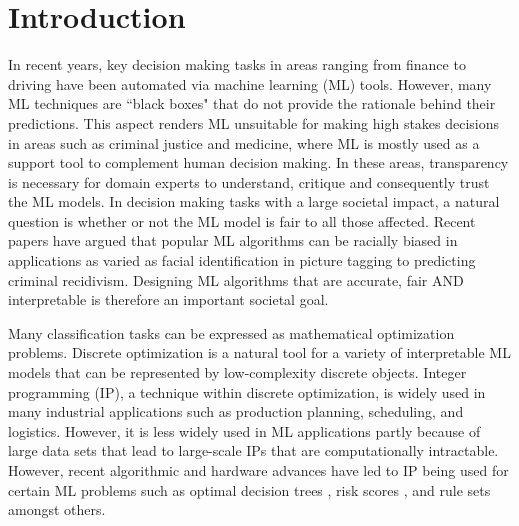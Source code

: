 \documentclass[twoside,11pt]{article}
\begin{document}
\section{Introduction}\label{sec:intro}
In recent years, key decision making tasks in areas ranging from finance to driving have been automated via machine learning (ML) tools. However,  many ML techniques are ``black boxes" that do not provide the rationale behind their predictions. This aspect renders ML unsuitable for making high stakes decisions in areas such as criminal justice and medicine, where ML is mostly used as a support tool to complement human decision making. In these areas, transparency is necessary for domain experts to understand, critique and consequently trust the ML models. 
In decision making tasks with a large societal impact, a natural question is whether or not the ML model is fair to all those affected. Recent papers \citep[e.g.][]{mehrabi2019survey} have argued that popular ML algorithms can be racially biased in applications as varied as facial identification in picture tagging to predicting criminal recidivism. Designing ML algorithms that are accurate, fair AND interpretable is therefore an important societal goal. 

Many classification tasks %
can be expressed as mathematical optimization problems. Discrete optimization is a natural tool for a variety of interpretable ML models that can be represented by low-complexity discrete objects. Integer programming (IP), a technique within discrete optimization, is widely used in many industrial applications such as production planning, scheduling, and logistics. However, it is less widely used in ML applications partly because of large data sets that lead to large-scale IPs that are computationally intractable. However, recent algorithmic and hardware advances have led to IP being used for certain ML problems such as optimal decision trees \citep{gunluk2019optimal, bertsimas2017, molero2020}, risk scores \citep{ustun2019learning}, and rule sets \citep{wang2015} amongst others.
\end{document}

